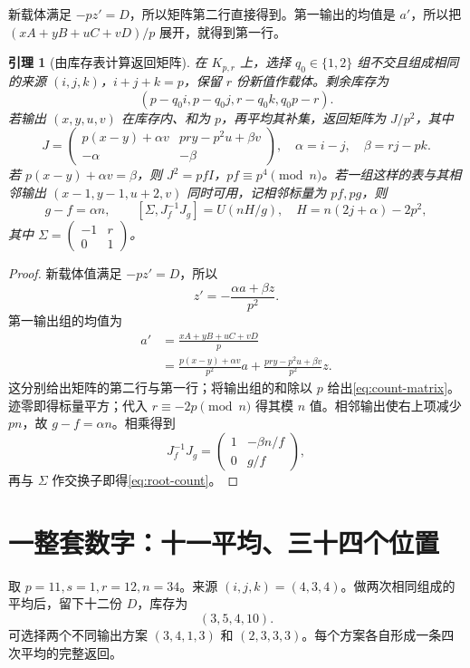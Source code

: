 \documentclass[11pt,a4paper,oneside,openany]{book}
\newtheorem{lemma}[theorem]{引理}
\theoremstyle{definition}
\numberwithin{equation}{chapter}
\begin{document}
新载体满足 $-pz'=D$，所以矩阵第二行直接得到。第一输出的均值是 $a'$，所以把 $(xA+yB+uC+vD)/p$ 展开，就得到第一行。
\begin{lemma}[由库存表计算返回矩阵]\label{lem:count-interface}
在 $K_{p,r}$ 上，选择 $q_0\in\{1,2\}$ 组不交且组成相同的来源 $(i,j,k)$，$i+j+k=p$，保留 $r$ 份新值作载体。剩余库存为
\begin{equation}\label{eq:stock}
(p-q_0i,p-q_0j,r-q_0k,q_0p-r).
\end{equation}
若输出 $(x,y,u,v)$ 在库存内、和为 $p$，再平均其补集，返回矩阵为 $J/p^2$，其中
\begin{equation}\label{eq:count-matrix}
J=\begin{pmatrix}p(x-y)+\alpha v&pry-p^2u+\beta v\\-\alpha&-\beta\end{pmatrix},
\quad \alpha=i-j,\quad\beta=rj-pk.
\end{equation}
若 $p(x-y)+\alpha v=\beta$，则 $J^2=pfI$，$pf\equiv p^4\pmod n$。若一组这样的表与其相邻输出 $(x-1,y-1,u+2,v)$ 同时可用，记相邻标量为 $pf,pg$，则
\begin{equation}\label{eq:root-count}
g-f=\alpha n,\qquad
[\Sigma,J_f^{-1}J_g]=U(nH/g),\quad H=n(2j+\alpha)-2p^2,
\end{equation}
其中 $\Sigma=\left(\begin{smallmatrix}-1&r\\0&1\end{smallmatrix}\right)$。
\end{lemma}
\begin{proof}

新载体值满足 $-pz'=D$，所以
\[
z'=-\frac{\alpha a+\beta z}{p^2}.
\]
第一输出组的均值为
\begin{align*}
a'&=\frac{xA+yB+uC+vD}{p}\\
&=\frac{p(x-y)+\alpha v}{p^2}a
 +\frac{pry-p^2u+\beta v}{p^2}z.
\end{align*}
这分别给出矩阵的第二行与第一行；将输出组的和除以 $p$ 给出\eqref{eq:count-matrix}。迹零即得标量平方；代入 $r\equiv-2p\pmod n$ 得其模 $n$ 值。相邻输出使右上项减少 $pn$，故 $g-f=\alpha n$。相乘得到
\[
J_f^{-1}J_g=\begin{pmatrix}1&-\beta n/f\\0&g/f\end{pmatrix},
\]
再与 $\Sigma$ 作交换子即得\eqref{eq:root-count}。
\end{proof}

\section{一整套数字：十一平均、三十四个位置}
取 $p=11,s=1,r=12,n=34$。来源 $(i,j,k)=(4,3,4)$。做两次相同组成的平均后，留下十二份 $D$，库存为
\[(3,5,4,10).
\]
可选择两个不同输出方案 $(3,4,1,3)$ 和 $(2,3,3,3)$。每个方案各自形成一条四次平均的完整返回。
\end{document}
